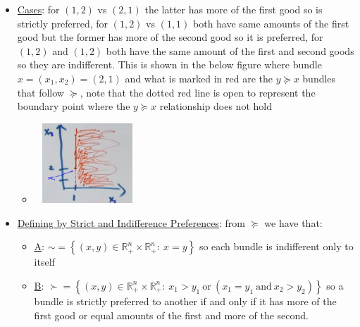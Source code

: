\documentclass{article}
\begin{document}
  \begin{itemize}
    \item  \underline{Cases}: for $(1,2)$ vs $(2,1)$ the latter has more of the first good so is strictly preferred, for $(1,2)$ vs $(1,1)$ both have same amounts of the first good but the former has more of the second good so it is preferred, for $(1,2)$ and $(1,2)$ both have the same amount of the first and second goods so they are indifferent. This is shown in the below figure where bundle $x = (x_{1}, x_{2}) = (2,1)$ and what is marked in red are the $y \succeq x$ bundles that follow $\succeq$, note that the dotted red line is open to represent the boundary point where the $y \succeq x$ relationship does not hold
    \begin{itemize}
      \item  \includegraphics[width=4cm, height=3cm]{pic11}
    \end{itemize}
    \item  \underline{Defining by Strict and Indifference Preferences}: from $\succeq$ we have that:
    \begin{itemize}
      \item  \underline{A}: $\sim = \left\{(x,y) \in \mathbb{R}_{+}^{n} \times \mathbb{R}_{+}^{n}: \ x = y \right\}$ so each bundle is indifferent only to itself
      \item  \underline{B}: $\succ = \left\{(x,y) \in \mathbb{R}_{+}^{n} \times \mathbb{R}_{+}^{n}: \ x_{1} > y_{1} \ \text{or} \ (x_{1} = y_{1} \ \text{and} \ x_{2} > y_{2}) \right\}$ so a bundle is strictly preferred to another if and only if it has more of the first good or equal amounts of the first and more of the second.
    \end{itemize}
  \end{itemize}
  \par
\vspace{6mm}
\end{document}
